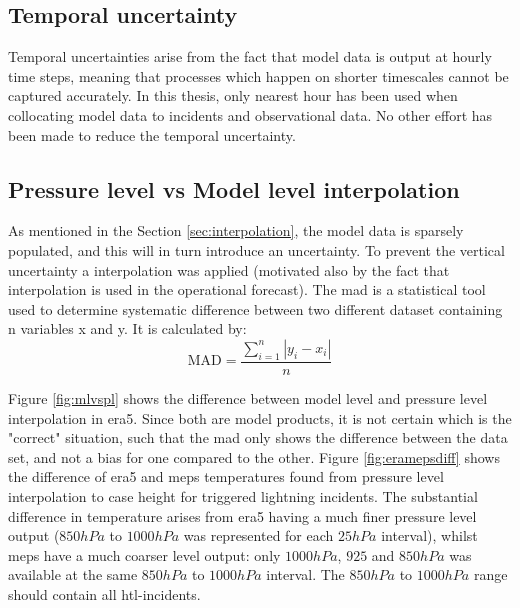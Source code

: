 \subsection{Temporal uncertainty}\label{sec:templim}
Temporal uncertainties arise from the fact that model data is output at hourly time steps, meaning that processes which happen on shorter timescales cannot be captured accurately. In this thesis, only nearest hour has been used when collocating model data to incidents and observational data. No other effort has been made to reduce the temporal uncertainty. 

\subsection{Pressure level vs Model level interpolation}\label{sec:plvsml}
As mentioned in the Section \ref{sec:interpolation}, the model data is sparsely populated, and this will in turn introduce an uncertainty. To prevent the vertical uncertainty a interpolation was applied (motivated also by the fact that interpolation is used in the operational forecast). The \acrshort{mad} is a statistical tool used to determine systematic difference between two different dataset containing n variables x and y. It is calculated by:
\[\text{MAD} = \frac{\sum_{i=1}^{n} |y_i -x_i|}{n}\]

Figure \ref{fig:mlvspl} shows the difference between model level and pressure level interpolation in \acrshort{era5}. Since both are model products, it is not certain which is the "correct" situation, such that the \acrshort{mad} only shows the difference between the data set, and not a bias for one compared to the other. Figure \ref{fig:eramepsdiff} shows the difference of \acrshort{era5} and \acrshort{meps} temperatures found from pressure level interpolation to case height for triggered lightning incidents. The substantial difference in temperature arises from \acrshort{era5} having a much finer pressure level output ($850hPa$ to $1000hPa$ was represented for each $25hPa$ interval), whilst \acrshort{meps} have a much coarser level output: only $1000hPa$, $925$ and $850hPa$ was available at the same $850hPa$ to $1000hPa$ interval. The $850hPa$ to $1000hPa$ range should contain all \acrshort{htl}-incidents.

